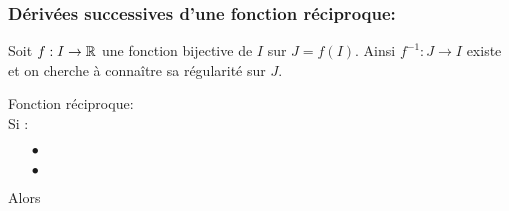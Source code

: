 \documentclass[a4paper, 11pt]{article}
\begin{document}
\subsubsection{D\'eriv\'ees successives d'une fonction r\'eciproque:}

\noindent Soit $f: I\rightarrow \mathbb{R}$ une fonction bijective de $I$ sur $J=f(I)$. Ainsi $f^{-1}: J\rightarrow I$ existe et on cherche \`{a} conna\^{i}tre sa r\'egularit\'e sur $J$.\vsec


{\noindent

	\begin{prop} Fonction r\'eciproque:\\
		\noindent Si :
		\begin{itemize}
			\item[$\bullet$] \dotfill \vsec
			\item[$\bullet$] \dotfill \vsec
		\end{itemize}
		Alors \dotfill \vsec
	\end{prop}
}
\vsec\vsec

\end{document}
